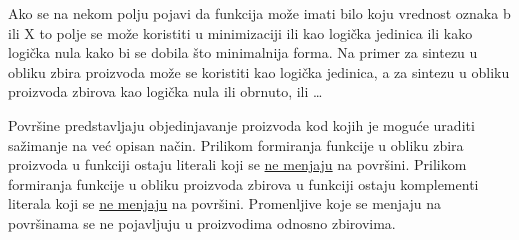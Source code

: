 \begin{frame}[label=02-s042]
Ako se na nekom polju pojavi da funkcija može imati bilo koju vrednost oznaka b ili X to polje se može koristiti u minimizaciji ili kao logička jedinica ili kako logička nula kako bi se dobila što minimalnija forma. Na primer za sintezu u obliku zbira proizvoda može se koristiti kao logička jedinica, a za sintezu u obliku proizvoda zbirova kao logička nula ili obrnuto, ili \ldots

Površine predstavljaju objedinjavanje proizvoda kod kojih je moguće uraditi sažimanje na već opisan način. Prilikom formiranja funkcije u obliku zbira proizvoda u funkciji ostaju literali koji se \underline{ne menjaju} na površini. Prilikom formiranja funkcije u obliku proizvoda zbirova u funkciji ostaju komplementi literala koji se \underline{ne menjaju} na površini. Promenljive koje se menjaju na površinama se ne pojavljuju u proizvodima odnosno zbirovima.
\end{frame}
